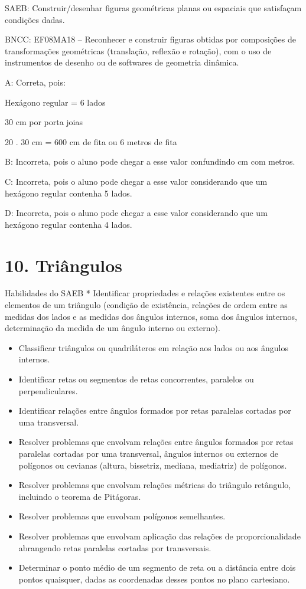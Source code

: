 {SAEB: Construir/desenhar figuras geométricas planas ou espaciais que
satisfaçam condições dadas.

BNCC: EF08MA18 -- Reconhecer e construir figuras obtidas por composições
de transformações geométricas (translação, reflexão e rotação), com o
uso de instrumentos de desenho ou de softwares de geometria dinâmica.

A: Correta, pois:

Hexágono regular = 6 lados

30 cm por porta joias

20 . 30 cm = 600 cm de fita ou 6 metros de fita

B: Incorreta, pois o aluno pode chegar a esse valor confundindo cm com
metros.

C: Incorreta, pois o aluno pode chegar a esse valor considerando que um
hexágono regular contenha 5 lados.

D: Incorreta, pois o aluno pode chegar a esse valor considerando que um
hexágono regular contenha 4 lados.


\section{10. Triângulos}

Habilidades do SAEB * Identificar propriedades e relações existentes
entre os elementos de um triângulo (condição de existência, relações de
ordem entre as medidas dos lados e as medidas dos ângulos internos, soma
dos ângulos internos, determinação da medida de um ângulo interno ou
externo).

\begin{itemize}
\item
  Classificar triângulos ou quadriláteros em relação aos lados ou aos
  ângulos internos.
\item
  Identificar retas ou segmentos de retas concorrentes, paralelos ou
  perpendiculares.
\item
  Identificar relações entre ângulos formados por retas paralelas
  cortadas por uma transversal.
\item
  Resolver problemas que envolvam relações entre ângulos formados por
  retas paralelas cortadas por uma transversal, ângulos internos ou
  externos de polígonos ou cevianas (altura, bissetriz, mediana,
  mediatriz) de polígonos.
\item
  Resolver problemas que envolvam relações métricas do triângulo
  retângulo, incluindo o teorema de Pitágoras.
\item
  Resolver problemas que envolvam polígonos semelhantes.
\item
  Resolver problemas que envolvam aplicação das relações de
  proporcionalidade abrangendo retas paralelas cortadas por
  transversais.
\item
  Determinar o ponto médio de um segmento de reta ou a distância entre
  dois pontos quaisquer, dadas as coordenadas desses pontos no plano
  cartesiano.
\end{itemize}

}
